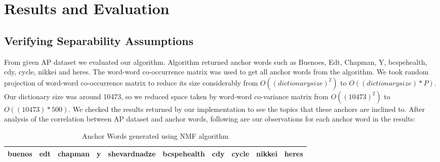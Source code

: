 \documentclass[a4paper,11pt]{article}
\begin{document}
\section{Results and Evaluation}

\subsection{Verifying Separability Assumptions}

From given AP dataset we evaluated our algorithm. Algorithm returned anchor words such as Buenoes, Edt, Chapman, Y, bcspehealth, cdy, cycle, nikkei and heres. The word-word co-occurrence matrix was used to get all anchor words from the algorithm. We took random projection of word-word co-occurrence matrix to reduce its size considerably from $O((dictionary size)^2)$ to $O((dictionary size)*P)$. Our dictionary size was around 10473, so we reduced space taken by word-word co-variance matrix from $O((10473)^2)$ to $O((10473)*500)$. We checked the results returned by our implementation to see the topics that these anchors are inclined to. After analysis of the correlation between AP dataset and anchor words, following are our observations for each anchor word in the results:

\begin{table}
    \begin{tabular}{|l|l|l|l|l|l|l|l|l|l|}
    \hline
    buenos & edt & chapman & y & shevardnadze & bcspehealth & cdy & cycle & nikkei & heres \\ \hline
    \end{tabular}
    \caption {Anchor Words generated using NMF algorithm}
\end{table}
\end{document}
